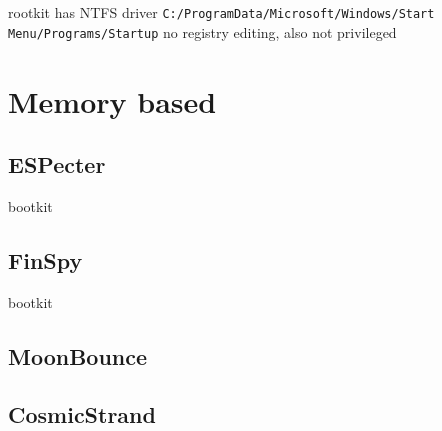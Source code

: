 rootkit
has NTFS driver
\lstinline{C:/ProgramData/Microsoft/Windows/Start Menu/Programs/Startup}
no registry editing, also not privileged

\section{Memory based}

\subsection{ESPecter}

bootkit

\subsection{FinSpy}


bootkit

\subsection{MoonBounce}

\subsection{CosmicStrand}
